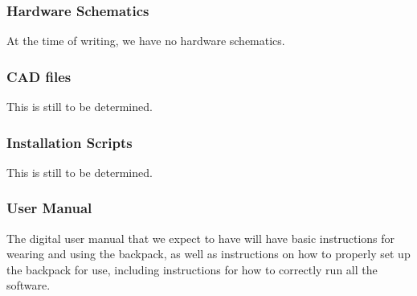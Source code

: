 \subsubsection{Hardware Schematics}
At the time of writing, we have no hardware schematics.

\subsubsection{CAD files}
This is still to be determined.

\subsubsection{Installation Scripts}
This is still to be determined.

\subsubsection{User Manual}
The digital user manual that we expect to have will have basic instructions for wearing and using the backpack, as well as instructions on how to properly set up the backpack for use, including instructions for how to correctly run all the software.
